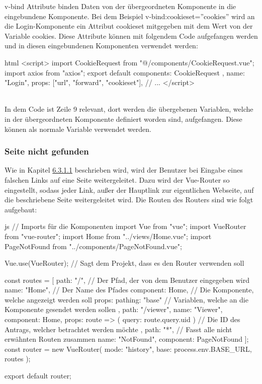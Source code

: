 v-bind Attribute binden Daten von der übergeordneten Komponente in die eingebundene Komponente. Bei dem Beispiel v-bind:cookieset=''cookies'' wird an die Login-Komponente ein Attribut cookieset mitgegeben mit dem Wert von der Variable cookies.
\newpage
Diese Attribute können mit folgendem Code aufgefangen werden und in diesen eingebundenen Komponenten verwendet werden:
\begin{code}{html}
<script>
	import CookieRequest from "@/components/CookieRequest.vue";
	import axios from "axios";
	export default {
		components: {
			CookieRequest
		},
		name: "Login",
		props: ["url", "forward", "cookieset"],
		// ...
	}
</script>
\end{code}
~\\
In dem Code ist Zeile 9 relevant, dort werden die übergebenen Variablen, welche in der übergeordneten Komponente definiert worden sind, aufgefangen. Diese können als normale Variable verwendet werden.
\newpage
\subsubsection{Seite nicht gefunden}
Wie in Kapitel \hyperref[sec:not_found]{6.3.1.1} beschrieben wird, wird der Benutzer bei Eingabe eines falschen Links auf eine Seite weitergeleitet. Dazu wird der Vue-Router so eingestellt, sodass jeder Link, außer der Hauptlink zur eigentlichen Webseite, auf die beschriebene Seite weitergeleitet wird. Die Routen des Routers sind wie folgt aufgebaut:
\begin{code}{js}
// Imports für die Komponenten
import Vue from "vue";
import VueRouter from "vue-router";
import Home from "../views/Home.vue";
import PageNotFound from "../components/PageNotFound.vue";

Vue.use(VueRouter);		// Sagt dem Projekt, dass es den Router verwenden soll

const routes = [
{
	path: "/",					// Der Pfad, der von dem Benutzer eingegeben wird
	name: "Home",				// Der Name des Pfades
	component: Home,			// Die Komponente, welche angezeigt werden soll
	props: { pathing: "base" }	// Variablen, welche an die Komponente gesendet werden sollen
},
{
	path: "/viewer",
	name: "Viewer",
	component: Home,
	props: route => ({ query: route.query.uid })	// Die ID des Antrags, welcher betrachtet werden möchte
},
{
	path: "*",				// Fasst alle nicht erwähnten Routen zusammen
	name: "NotFound",
	component: PageNotFound
}
];
const router = new VueRouter({
	mode: "history",
	base: process.env.BASE_URL,
	routes
});

export default router;
\end{code}
~\\

